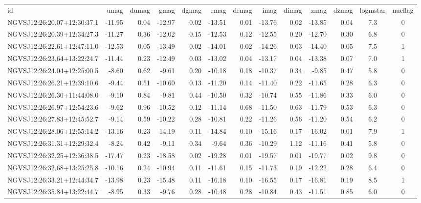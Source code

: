 \begin{tabular}{lrrrrrrrrrrcc}
id & umag & dumag & gmag & dgmag & rmag & drmag & imag & dimag & zmag & dzmag & logmstar & nucflag \\
NGVSJ12:26:20.07+12:30:37.1 & -11.95 & 0.04 & -12.97 & 0.02 & -13.51 & 0.01 & -13.76 & 0.02 & -13.85 & 0.04 & 7.3 & 0 \\
NGVSJ12:26:20.39+12:34:27.3 & -11.27 & 0.36 & -12.02 & 0.15 & -12.53 & 0.12 & -12.55 & 0.20 & -12.70 & 0.30 & 6.8 & 0 \\
NGVSJ12:26:22.61+12:47:11.0 & -12.53 & 0.05 & -13.49 & 0.02 & -14.01 & 0.02 & -14.26 & 0.03 & -14.40 & 0.05 & 7.5 & 1 \\
NGVSJ12:26:23.64+13:22:24.7 & -11.44 & 0.23 & -12.49 & 0.03 & -13.02 & 0.04 & -13.17 & 0.04 & -13.38 & 0.07 & 7.0 & 1 \\
NGVSJ12:26:24.04+12:25:00.5 & -8.60 & 0.62 & -9.61 & 0.20 & -10.18 & 0.18 & -10.37 & 0.34 & -9.85 & 0.47 & 5.8 & 0 \\
NGVSJ12:26:26.21+12:39:10.6 & -9.44 & 0.51 & -10.60 & 0.13 & -11.20 & 0.14 & -11.40 & 0.22 & -11.65 & 0.28 & 6.3 & 0 \\
NGVSJ12:26:26.30+11:44:08.0 & -9.10 & 0.84 & -9.81 & 0.44 & -10.50 & 0.32 & -10.74 & 0.55 & -11.86 & 0.33 & 6.0 & 0 \\
NGVSJ12:26:26.97+12:54:23.6 & -9.62 & 0.96 & -10.52 & 0.12 & -11.14 & 0.68 & -11.50 & 0.63 & -11.79 & 0.53 & 6.3 & 0 \\
NGVSJ12:26:27.83+12:45:52.7 & -9.14 & 0.59 & -10.22 & 0.28 & -10.81 & 0.22 & -11.26 & 0.56 & -11.20 & 0.54 & 6.2 & 0 \\
NGVSJ12:26:28.06+12:55:14.2 & -13.16 & 0.23 & -14.19 & 0.11 & -14.84 & 0.10 & -15.16 & 0.17 & -16.02 & 0.01 & 7.9 & 1 \\
NGVSJ12:26:31.31+12:29:32.4 & -8.24 & 0.42 & -9.11 & 0.34 & -9.64 & 0.36 & -10.29 & 1.12 & -11.16 & 0.41 & 5.8 & 0 \\
NGVSJ12:26:32.25+12:36:38.5 & -17.47 & 0.23 & -18.58 & 0.02 & -19.28 & 0.01 & -19.57 & 0.01 & -19.77 & 0.02 & 9.8 & 0 \\
NGVSJ12:26:32.68+13:25:25.8 & -10.16 & 0.24 & -10.94 & 0.11 & -11.61 & 0.15 & -11.73 & 0.19 & -12.22 & 0.28 & 6.4 & 0 \\
NGVSJ12:26:33.21+12:44:34.7 & -13.98 & 0.23 & -15.48 & 0.11 & -16.18 & 0.10 & -16.55 & 0.17 & -16.81 & 0.19 & 8.5 & 1 \\
NGVSJ12:26:35.84+13:22:44.7 & -8.95 & 0.33 & -9.76 & 0.28 & -10.48 & 0.28 & -10.84 & 0.43 & -11.51 & 0.85 & 6.0 & 0 \\

\end{tabular}

